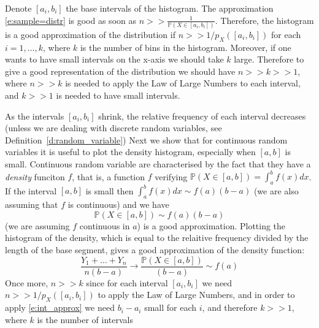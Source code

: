 	Denote $[a_i,b_i]$ the base intervals of the histogram. The approximation \eqref{e:sample=distr} is good as soon as $n >> \frac{1}{\mathbb P(X \in [a_i,b_i])}$. Therefore, the histogram is a good approximation of the distribution if $n >>1/p_X([a_i,b_i])$ for each $i =1,\ldots, k $, where $k$ is the number of bins in the histogram. Moreover, if one wants to have small intervals on the x-axis we should take $k$ large. Therefore to give a good representation of the distribution we should have $n >> k>> 1$, where $n>>k$ is needed to apply the Law of Large Numbers to each interval, and $k >>1$ is needed to have small intervals. 
		
		\begin{example}
			As the intervals $[a_i,b_i]$ shrink, the relative frequency of each interval decreases (unless we are dealing with discrete random variables, see Definition~\ref{d:random_variable}) Next we show that for continuous random variables it is useful to plot the density histogram, especially when $[a,b]$ is small. Continuous random variable are characterised by the fact that they have a \emph{density} funciton $f$, that is, a function $f$ verifying  $\mathbb P(X \in [a, b]) = \int_a^b f(x) dx$. If the interval $[a,b]$ is small then $ \int_a^b f(x) dx \sim f(a)(b - a)$ (we are also assuming that $f$ is continuous) and we have 
				\begin{equation}
					\label{e:int_approx}
					\mathbb P(X \in [a,b]) \sim f(a) (b-a)
				\end{equation} 
				(we are assuming $f$ continuous in $a$) is a good approximation. Plotting the histogram of the density, which is equal to the relaitive frequency divided by the length of the base segment, gives  a good approximation of the density function: 
				\begin{equation}
				\frac{Y_1 + \ldots + Y_n}{n(b-a)} \to \frac{\mathbb P(X \in [a,b])}{(b-a)}  \sim f(a)
				\end{equation}
				Once more, $n >> k$ since for each interval $[a_i,b_i]$ we need $ n >> 1/p_X([a_i,b_i])$ to apply the Law of Large Numbers, and in order to apply \eqref{e:int_approx} we need $b_i - a_i$ small for each $i$, and therefore $k >>1$, where $k$ is the number of intervals


\end{example}
